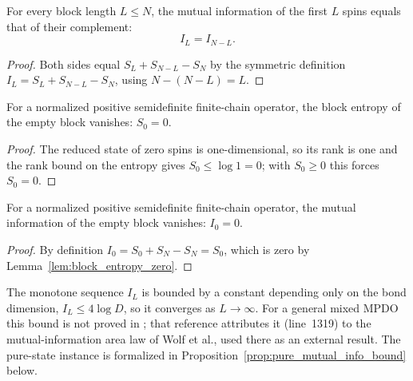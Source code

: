 \begin{lemma}
    \label{lem:mutual_info_chain_symm}
    \leanok
    For every block length $L\le N$, the mutual information of the first $L$ spins
    equals that of their complement:
    \[
        I_L = I_{N-L}.
    \]
\end{lemma}
\begin{proof}\leanok
    Both sides equal $S_L + S_{N-L} - S_N$ by the symmetric definition
    $I_L = S_L + S_{N-L} - S_N$, using $N-(N-L) = L$.
\end{proof}

\begin{lemma}
    \label{lem:block_entropy_zero}
    \leanok
    For a normalized positive semidefinite finite-chain operator, the block entropy of
    the empty block vanishes: $S_0 = 0$.
\end{lemma}
\begin{proof}\leanok
    The reduced state of zero spins is one-dimensional, so its rank is one and the rank
    bound on the entropy gives $S_0 \le \log 1 = 0$; with $S_0 \ge 0$ this forces
    $S_0 = 0$.
\end{proof}

\begin{lemma}
    \label{lem:mutual_info_chain_zero}
    \leanok
    For a normalized positive semidefinite finite-chain operator, the mutual information
    of the empty block vanishes: $I_0 = 0$.
\end{lemma}
\begin{proof}\leanok
    By definition $I_0 = S_0 + S_N - S_N = S_0$, which is zero by
    Lemma~\ref{lem:block_entropy_zero}.
\end{proof}

\begin{remark}
    The monotone sequence $I_L$ is bounded by a constant depending only on the
    bond dimension, $I_L \le 4\log D$, so it converges as $L\to\infty$. For a
    general mixed MPDO this bound is not proved in
    \cite{Cirac2016MPDO_arXiv}; that reference attributes it (line~1319) to the
    mutual-information area law of Wolf et al., used there as an external result.
    The pure-state instance is formalized in
    Proposition~\ref{prop:pure_mutual_info_bound} below.
\end{remark}

